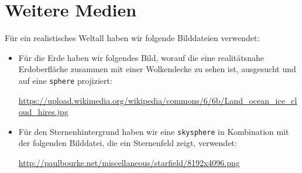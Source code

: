 \section{Weitere Medien}
Für ein realistisches Weltall haben wir folgende Bilddateien verwendet:
\begin{itemize}
	\item Für die Erde haben wir folgendes Bild, worauf die eine realitätsnahe Erdoberfläche zusammen mit einer Wolkendecke zu sehen ist, ausgesucht und auf eine \texttt{sphere} projiziert:
	
	\url{https://upload.wikimedia.org/wikipedia/commons/6/6b/Land_ocean_ice_cloud_hires.jpg}
	
	\item Für den Sternenhintergrund haben wir eine \texttt{skysphere} in Kombination mit der folgenden Bilddatei, die ein Sternenfeld zeigt, verwendet:
	
	\url{http://paulbourke.net/miscellaneous/starfield/8192x4096.png}
\end{itemize}